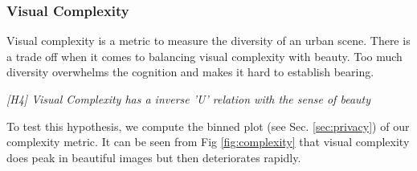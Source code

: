 
\subsubsection{Visual Complexity }
Visual complexity is a metric to measure the diversity of an urban scene. There is a trade off  when it comes to balancing visual complexity with beauty. Too much diversity overwhelms the cognition and makes it hard to establish bearing. 
\par
\textit{[H4] Visual Complexity has a inverse 'U' relation with the sense of beauty }
\par

To test  this hypothesis, we compute the binned plot (see Sec. \ref{sec:privacy}) of our complexity metric. It can be seen from Fig \ref{fig:complexity} that visual complexity does peak in beautiful images but then deteriorates rapidly.


